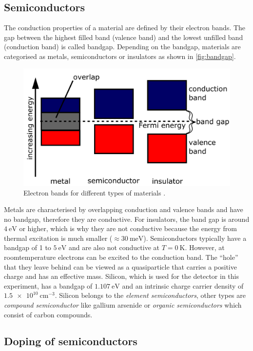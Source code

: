 \subsection{Semiconductors}
\label{subsec:Semiconductors}
The conduction properties of a material are defined by their electron bands. The gap between the highest filled band (valence band) and the lowest unfilled band (conduction band)
is called bandgap. Depending on the bandgap, materials are categorised as metals, semiconductors or insulators as shown in \autoref{fig:bandgap}.
\begin{figure}
    \centering 
    \includegraphics[width = .6\textwidth]{content/pics/Band_gap.png}
    \caption{Electron bands for different types of materials \cite{Bandgap}.}
    \label{fig:bandgap}
\end{figure}
Metals are characterised by overlapping conduction and valence bands and have no bandgap, therefore they are conductive. 
For insulators, the band gap is around $\qty{4}{\eV}$ or higher, which is why they are not conductive because the energy from thermal excitation 
is much smaller ($\approx\qty{30}{\milli\eV}$). Semiconductors typically have a bandgap of 1 to $\qty{5}{\eV}$ and are also not conductive at 
$T = \qty{0}{\kelvin}$. However, at roomtemperature electrons can be excited to the conduction band. The \enquote{hole} that they leave behind can be viewed as a quasiparticle that 
carries a positive charge and has an effective mass. Silicon, which is used for the detector in this experiment, has a bandgap of $\qty{1.107}{\eV}$ and an intrinsic charge 
carrier density of $\qty{1.5e10}{\centi\metre^{-3}}$. Silicon belongs to the \textit{element semiconductors}, other types are \textit{compound semiconductor} 
like gallium arsenide or \textit{organic semiconductors} which consist of carbon compounds.

\subsection{Doping of semiconductors}

